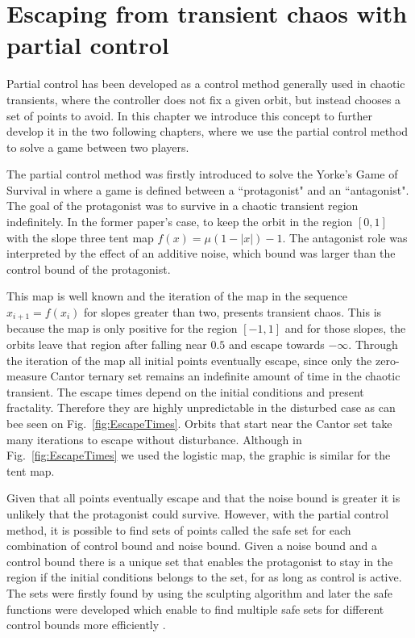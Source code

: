\chapter{Escaping from transient chaos with partial control} %
\label{chap:ForcingEscape}

Partial control has been developed as a control method generally used in chaotic transients, where the controller does not fix a given orbit, but instead chooses a set of points to avoid. In this chapter we introduce this concept to further develop it in the two following chapters, where we use the partial control method to solve a game between two players. 

The partial control method was firstly introduced to solve the Yorke's Game of Survival in \cite{Yorke'sGame} where a game is defined between a ``protagonist" and an ``antagonist". The goal of the protagonist was to survive in a chaotic transient region indefinitely. In the former paper's case, to keep the orbit in the region $[0,1]$ with the slope three tent map $f(x) = \mu(1-|x|)-1$. The antagonist role was interpreted by the effect of an additive noise, which bound was larger than the control bound of the protagonist.

This map is well known and the iteration of the map in the sequence $x_{i+1} = f(x_i)$ for slopes greater than two, presents transient chaos. This is because the map is only positive for the region $[-1,1]$ and for those slopes, the orbits leave that region after falling near $0.5$ and escape towards $-\infty$. Through the iteration of the map all initial points eventually escape, since only the zero-measure Cantor ternary set remains an indefinite amount of time in the chaotic transient. The escape times depend on the initial conditions and present fractality. Therefore they are highly unpredictable in the disturbed case as can bee seen on Fig.~\ref{fig:EscapeTimes}. Orbits that start near the Cantor set take many iterations to escape without disturbance. Although in Fig.~\ref{fig:EscapeTimes} we used the logistic map, the graphic is similar for the tent map.

Given that all points eventually escape and that the noise bound is greater it is unlikely that the protagonist could survive. However, with the partial control method, it is possible to find sets of points called the safe set for each combination of control bound and noise bound. Given a noise bound and a control bound there is a unique set that enables the protagonist to stay in the region if the initial conditions belongs to the set, for as long as control is active. The sets were firstly found by using the sculpting algorithm \cite{Sculpting} and later the safe functions were developed which enable to find multiple safe sets for different control bounds more efficiently \cite{SafeSets}.

